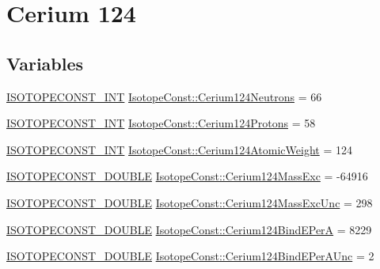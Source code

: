 \hypertarget{group___isotope_const-_cerium-_ce124}{}\section{Cerium 124}
\label{group___isotope_const-_cerium-_ce124}
\subsection*{Variables}
\begin{DoxyCompactItemize}
\item 
\mbox{\hyperlink{group___isotope_const-_macros_ga5f18360b3e99483a35c32d789e62621c}{I\+S\+O\+T\+O\+P\+E\+C\+O\+N\+S\+T\+\_\+\+I\+NT}} \mbox{\hyperlink{group___isotope_const-_cerium-_ce124_ga7439896d54255d80bfbfc9fe49ad6f12}{Isotope\+Const\+::\+Cerium124\+Neutrons}} = 66
\item 
\mbox{\hyperlink{group___isotope_const-_macros_ga5f18360b3e99483a35c32d789e62621c}{I\+S\+O\+T\+O\+P\+E\+C\+O\+N\+S\+T\+\_\+\+I\+NT}} \mbox{\hyperlink{group___isotope_const-_cerium-_ce124_ga73ee227190e7244117f792ce7c617558}{Isotope\+Const\+::\+Cerium124\+Protons}} = 58
\item 
\mbox{\hyperlink{group___isotope_const-_macros_ga5f18360b3e99483a35c32d789e62621c}{I\+S\+O\+T\+O\+P\+E\+C\+O\+N\+S\+T\+\_\+\+I\+NT}} \mbox{\hyperlink{group___isotope_const-_cerium-_ce124_ga66093ac50218b3dd1c8487e6fc343485}{Isotope\+Const\+::\+Cerium124\+Atomic\+Weight}} = 124
\item 
\mbox{\hyperlink{group___isotope_const-_macros_ga8f45a7272ce02c0b4c65c44636ed719a}{I\+S\+O\+T\+O\+P\+E\+C\+O\+N\+S\+T\+\_\+\+D\+O\+U\+B\+LE}} \mbox{\hyperlink{group___isotope_const-_cerium-_ce124_gae25d5a5bbfb87d6b4447e5c8008c620a}{Isotope\+Const\+::\+Cerium124\+Mass\+Exc}} = -\/64916
\item 
\mbox{\hyperlink{group___isotope_const-_macros_ga8f45a7272ce02c0b4c65c44636ed719a}{I\+S\+O\+T\+O\+P\+E\+C\+O\+N\+S\+T\+\_\+\+D\+O\+U\+B\+LE}} \mbox{\hyperlink{group___isotope_const-_cerium-_ce124_ga016ffd2951589763c218c3ccb646a325}{Isotope\+Const\+::\+Cerium124\+Mass\+Exc\+Unc}} = 298
\item 
\mbox{\hyperlink{group___isotope_const-_macros_ga8f45a7272ce02c0b4c65c44636ed719a}{I\+S\+O\+T\+O\+P\+E\+C\+O\+N\+S\+T\+\_\+\+D\+O\+U\+B\+LE}} \mbox{\hyperlink{group___isotope_const-_cerium-_ce124_gaed9e5b65423fb3f85374e992e2660ff4}{Isotope\+Const\+::\+Cerium124\+Bind\+E\+PerA}} = 8229
\item 
\mbox{\hyperlink{group___isotope_const-_macros_ga8f45a7272ce02c0b4c65c44636ed719a}{I\+S\+O\+T\+O\+P\+E\+C\+O\+N\+S\+T\+\_\+\+D\+O\+U\+B\+LE}} \mbox{\hyperlink{group___isotope_const-_cerium-_ce124_ga8b38c411428a95e05df0dacb2580c878}{Isotope\+Const\+::\+Cerium124\+Bind\+E\+Per\+A\+Unc}} = 2

\end{DoxyCompactItemize}
